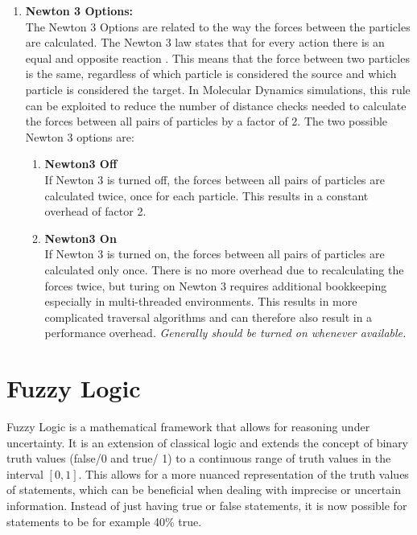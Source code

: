 \begin{enumerate}[label=\textbf{\arabic*.}]
      \item \textbf{Newton 3 Options:} \\
            The Newton 3 Options are related to the way the forces between the particles are calculated. The Newton 3 law states that for every action there is an equal and opposite reaction . This means that the force between two particles is the same, regardless of which particle is considered the source and which particle is considered the target. In Molecular Dynamics simulations, this rule can be exploited to reduce the number of distance checks needed to calculate the forces between all pairs of particles by a factor of 2. The two possible Newton 3 options are:
            \begin{enumerate}
                  \item \textbf{Newton3 Off} \\
                        If Newton 3 is turned off, the forces between all pairs of particles are calculated twice, once for each particle. This results in a constant overhead of factor 2.

                  \item \textbf{Newton3 On} \\
                        If Newton 3 is turned on, the forces between all pairs of particles are calculated only once. There is no more overhead due to recalculating the forces twice, but turing on Newton 3 requires additional bookkeeping especially in multi-threaded environments. This results in more complicated traversal algorithms and can therefore also result in a performance overhead.
                        \textit{Generally should be turned on whenever available.}
            \end{enumerate}

\end{enumerate}

\section{Fuzzy Logic}

Fuzzy Logic is a mathematical framework that allows for reasoning under uncertainty. It is an extension of classical logic and extends the concept of binary truth values (false/0 and true/ 1) to a continuous range of truth values in the interval $[0, 1]$. This allows for a more nuanced representation of the truth values of statements, which can be beneficial when dealing with imprecise or uncertain information. Instead of just having true or false statements, it is now possible for statements to be for example 40\% true.

